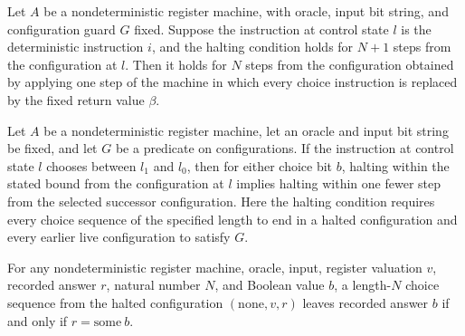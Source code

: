 \begin{lemma}
\label{Complexity.LogProg.NHalts.of_det}
\leanok
{}
Let $A$ be a nondeterministic register machine, with oracle, input bit string, and
configuration guard $G$ fixed. Suppose the instruction at control state $l$ is the
deterministic instruction $i$, and the halting condition holds for $N+1$ steps from the
configuration at $l$. Then it holds for $N$ steps from the configuration obtained by
applying one step of the machine in which every choice instruction is replaced by the
fixed return value $\beta$.
\end{lemma}

\begin{lemma}
\label{Complexity.LogProg.NHalts.of_choose}
\leanok
{}
Let $A$ be a nondeterministic register machine, let an oracle and input bit string be
fixed, and let $G$ be a predicate on configurations. If the instruction at control state
$l$ chooses between $l_1$ and $l_0$, then for either choice bit $b$, halting within the
stated bound from the configuration at $l$ implies halting within one fewer step from
the selected successor configuration. Here the halting condition requires every choice
sequence of the specified length to end in a halted configuration and every earlier live
configuration to satisfy $G$.
\end{lemma}

\begin{lemma}
\label{Complexity.LogProg.nans_halted}
\leanok
{}
For any nondeterministic register machine, oracle, input, register valuation $v$,
recorded answer $r$, natural number $N$, and Boolean value $b$, a length-$N$ choice
sequence from the halted configuration $(\mathrm{none},v,r)$ leaves recorded answer $b$
if and only if $r=\mathrm{some}\ b$.
\end{lemma}

